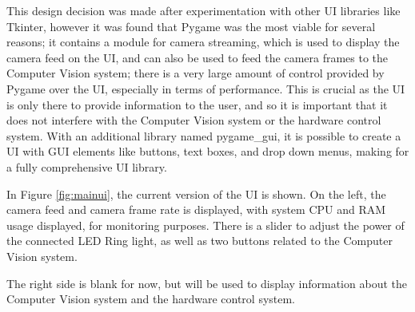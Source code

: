 This design decision was made after experimentation with other UI libraries like Tkinter\cite{tkinterdoc}, however it was found that Pygame was the most
viable for several reasons; it contains a module for camera streaming, which is used to display the camera feed on the UI, and can also be used to
feed the camera frames to the Computer Vision system; there is a very large amount of control provided by Pygame over the UI, especially in terms of 
performance. This is crucial as the UI is only there to provide information to the user, and so it is important that it does not interfere with the
Computer Vision system or the hardware control system. With an additional library named pygame\_gui\cite{pygamegui}, it is possible to create a UI with 
GUI elements like buttons, text boxes, and drop down menus, making for a fully comprehensive UI library.

In Figure \ref*{fig:mainui}, the current version of the UI is shown. On the left, the camera feed and camera frame rate is displayed, with system
CPU and RAM usage displayed, for monitoring purposes. There is a slider to adjust the power of the connected LED Ring light, as well as two buttons
related to the Computer Vision system.

The right side is blank for now, but will be used to display information about the Computer Vision system and the hardware control system.
